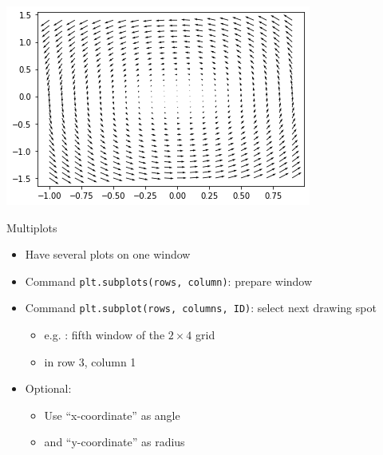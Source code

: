
\begin{frame}[fragile]
%
\begin{tcolorbox}[title=Quiver Plot]
\begin{center}
	\includegraphics[width=.65\linewidth]{./gfx/plt-vortex}
\end{center}
\end{tcolorbox}
%
\end{frame}


\begin{frame}{Multiplots}
%
\begin{itemize}
\item Have several plots on one window
\item Command \texttt{plt.subplots(rows, column)}: prepare window
\item Command \texttt{plt.subplot(rows, columns, ID)}: select next drawing spot
	\begin{itemize}
	\item e.\;g. : fifth window of the $2 \times 4$ grid
	\item \ie in row 3, column 1
	\end{itemize}
\item Optional: 
	\begin{itemize}
	\item Use \enquote{x-coordinate} as angle
	\item and \enquote{y-coordinate} as radius
	\end{itemize}
\end{itemize}
%
\end{frame}


